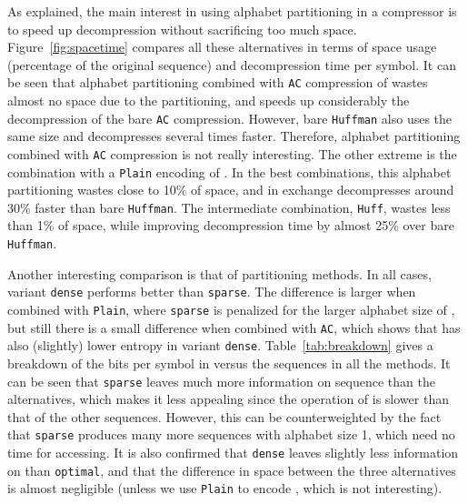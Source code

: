 \documentclass[11pt]{article}
\begin{document}
\begin{table}[t]
{\begin{tabular}
As explained, the main interest in using alphabet partitioning in a 
compressor is to speed up decompression without sacrificing too much space.
Figure~\ref{fig:spacetime} compares all these alternatives in terms of space
usage (percentage of the original sequence) and decompression time per symbol. 
It can be seen that alphabet partitioning combined with {\tt AC} compression
of  wastes almost no space due to the partitioning, and speeds up 
considerably the decompression of the bare {\tt AC} compression.
However, bare {\tt Huffman} also uses the same size and decompresses several
times faster. Therefore, alphabet partitioning combined with {\tt AC}
compression is not really interesting. The other extreme is the combination
with a {\tt Plain} encoding of . In the best combinations, this alphabet
partitioning wastes close to 10\% of space, and in exchange decompresses
around 30\% faster than bare {\tt Huffman}. The intermediate combination,
{\tt Huff}, wastes less than 1\% of space, while improving decompression time
by almost 25\% over bare {\tt Huffman}.

Another interesting comparison is that of partitioning methods. In all cases,
variant {\tt dense} performs better than {\tt sparse}. The difference is larger
when combined with {\tt Plain}, where {\tt sparse} is penalized for the larger
alphabet size of , but still there is a small difference when combined with
{\tt AC}, which shows that  has also (slightly) lower entropy in variant 
{\tt dense}. 
Table~\ref{tab:breakdown} gives a breakdown of the bits per symbol in 
versus the sequences  in all the methods. It can be seen that 
{\tt sparse} leaves much more information on sequence  than the 
alternatives, which makes it less appealing since the operation of  is 
slower than that of the other sequences. However, this can be counterweighted 
by the fact that {\tt sparse} produces many more sequences with alphabet size 
1, which need no time for accessing. It is also confirmed that {\tt dense} 
leaves slightly less information on  than {\tt optimal}, and that the 
difference in space between the three alternatives is almost negligible 
(unless we use {\tt Plain} to encode , which is not interesting).



\end{tabular}}
\end{table}
\end{document}
